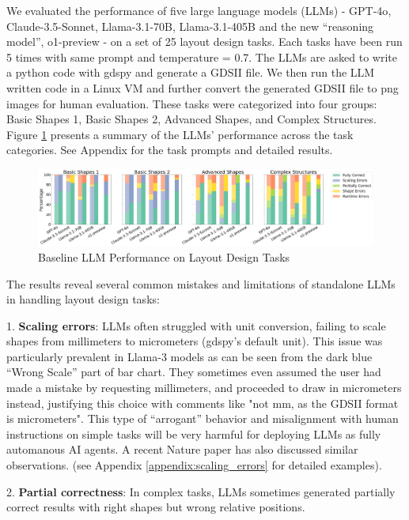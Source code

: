 \documentclass{article}
\begin{document}
We evaluated the performance of five large language models (LLMs) - GPT-4o\cite{GPT-4o}, Claude-3.5-Sonnet\cite{Claude-3.5-Sonnet}, Llama-3.1-70B\cite{Llama-3.1-70B}, Llama-3.1-405B\cite{Llama-3.1-405B} and the new ``reasoning model'', o1-preview\cite{o1-preview} - on a set of 25 layout design tasks. Each tasks have been run 5 times with same prompt and temperature = 0.7. The LLMs are asked to write a python code with gdspy\cite{gdspy} and generate a GDSII file. We then run the LLM written code in a Linux VM and further convert the generated GDSII file to png images for human evaluation. These tasks were categorized into four groups: Basic Shapes 1, Basic Shapes 2, Advanced Shapes, and Complex Structures. Figure \ref{fig:baseline-llm-performance} presents a summary of the LLMs' performance across the task categories. See Appendix for the task prompts and detailed results.
\begin{figure}[h]
  \centering
  \includegraphics[width=\textwidth]{output.png}
  \caption{Baseline LLM Performance on Layout Design Tasks}
  \label{fig:baseline-llm-performance}
\end{figure}
The results reveal several common mistakes and limitations of standalone LLMs in handling layout design tasks:

1. \textbf{Scaling errors}: LLMs often struggled with unit conversion, failing to scale shapes from millimeters to micrometers (gdspy's default unit). This issue was particularly prevalent in Llama-3 models as can be seen from the dark blue ``Wrong Scale'' part of bar chart. They sometimes even assumed the user had made a mistake by requesting millimeters, and proceeded to 
draw in micrometers instead, justifying this choice 
with comments like "not mm, as the GDSII format is 
micrometers". This type of ``arrogant'' behavior and 
misalignment with human instructions on simple tasks 
will be very harmful for deploying LLMs as fully 
automanous AI agents. A recent Nature paper \cite
{ZhouNature2024} has also discussed similar 
observations. (see Appendix \ref{appendix:scaling_errors} for detailed examples).

2. \textbf{Partial correctness}: In complex tasks, LLMs sometimes generated partially correct results with right shapes but wrong relative positions.
\end{document}
